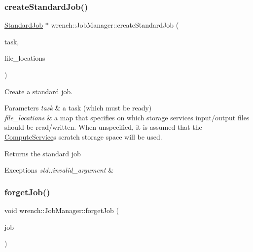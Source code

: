 \subsubsection{\texorpdfstring{create\+Standard\+Job()}{createStandardJob()}\hspace{0.1cm}{\footnotesize\ttfamily [3/3]}}
{\footnotesize\ttfamily \hyperlink{classwrench_1_1_standard_job}{Standard\+Job} $\ast$ wrench\+::\+Job\+Manager\+::create\+Standard\+Job (\begin{DoxyParamCaption}\item[{\hyperlink{classwrench_1_1_workflow_task}{Workflow\+Task} $\ast$}]{task,  }\item[{std\+::map$<$ \hyperlink{classwrench_1_1_workflow_file}{Workflow\+File} $\ast$, \hyperlink{classwrench_1_1_storage_service}{Storage\+Service} $\ast$$>$}]{file\+\_\+locations }\end{DoxyParamCaption})}



Create a standard job. 


\begin{DoxyParams}{Parameters}
{\em task} & a task (which must be ready) \\
\hline
{\em file\+\_\+locations} & a map that specifies on which storage services input/output files should be read/written. When unspecified, it is assumed that the \hyperlink{classwrench_1_1_compute_service}{Compute\+Service}\textquotesingle{}s scratch storage space will be used.\\
\hline
\end{DoxyParams}
\begin{DoxyReturn}{Returns}
the standard job
\end{DoxyReturn}

\begin{DoxyExceptions}{Exceptions}
{\em std\+::invalid\+\_\+argument} & \\
\hline
\end{DoxyExceptions}
\mbox{\label{classwrench_1_1_job_manager_ab10f770cc7ce3c022f889ad9cc3fcf0b}} 
\subsubsection{\texorpdfstring{forget\+Job()}{forgetJob()}}
{\footnotesize\ttfamily void wrench\+::\+Job\+Manager\+::forget\+Job (\begin{DoxyParamCaption}\item[{\hyperlink{classwrench_1_1_workflow_job}{Workflow\+Job} $\ast$}]{job }\end{DoxyParamCaption})}



